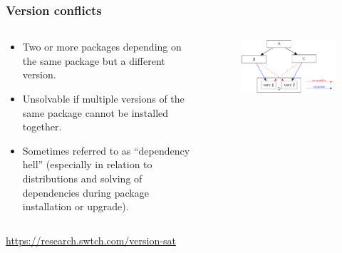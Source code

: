 \documentclass[aspectratio=169]{beamer}              %
\begin{document}
\begin{frame}
	\frametitle{Version conflicts}
	

\begin{columns}
\begin{column}{0.5\textwidth}

	\begin{block}{}
		\begin{itemize}
			\item Two or more packages depending on the same package but a different version.
			\item Unsolvable if multiple versions of the same package cannot be installed together.
			\item Sometimes referred to as ``dependency hell'' (especially in relation to distributions and solving of dependencies during package installation or upgrade).
		\end{itemize}
	\end{block}

\end{column}

\begin{column}{0.5\textwidth}
	\begin{figure}[ht!]
	\begin{center}
  	  \includegraphics[width=\textwidth]{img/dependency-hell.png}
	\end{center}
	\end{figure}
\end{column}
\end{columns}

\tiny{\url{https://research.swtch.com/version-sat}}
\end{frame}
\end{document}
